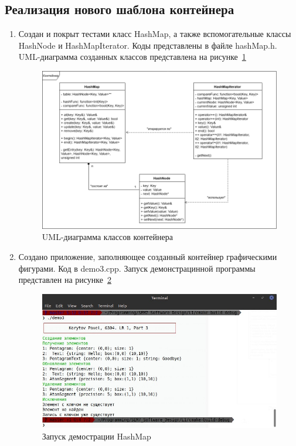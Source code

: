 \documentclass[a4paper, 14pt]{extarticle}
\begin{document}
\subsection{Реализация нового шаблона контейнера}
\begin{enumerate}
    \item Создан и покрыт тестами класс HashMap, а также вспомогательные классы HashNode и HashMapIterator. Коды представлены в файле hashMap.h.
    UML-диаграмма созданных классов представлена на рисунке~\ref{img:uml:container}
    \begin{figure}[h]
        \centering
        \includegraphics[width=\textwidth]{./img/container_classes_uml.png}
        \caption{UML-диаграмма классов контейнера}%
        \label{img:uml:container}
    \end{figure}
    \item Создано приложение, заполняющее созданный контейнер графическими фигурами. Код в demo3.cpp. Запуск демонстрацинной программы представлен на рисунке~\ref{img:map:demo}
    \begin{figure}[h]
        \centering
        \includegraphics[width=\textwidth]{./img/S006.jpg}
        \caption{Запуск демострации HashMap}%
        \label{img:map:demo}
    \end{figure}


\end{enumerate}
\end{document}

